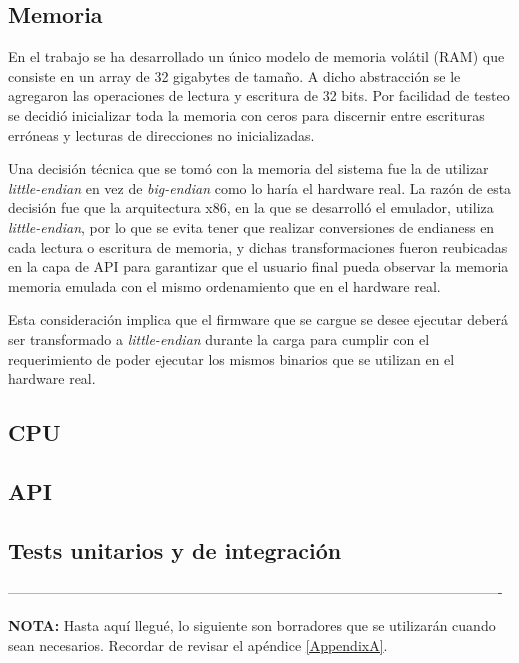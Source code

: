 \subsection{Memoria}
\label{subsec:memoria}

En el trabajo se ha desarrollado un único modelo de memoria volátil (RAM) que consiste en un array de 32 gigabytes de tamaño. A dicho abstracción se le agregaron las operaciones de lectura y escritura de 32 bits. Por facilidad de testeo se decidió inicializar toda la memoria con ceros para discernir entre escrituras erróneas y lecturas de direcciones no inicializadas.

Una decisión técnica que se tomó con la memoria del sistema fue la de utilizar \textit{little-endian} en vez de \textit{big-endian} como lo haría el hardware real. La razón de esta decisión fue que la arquitectura x86, en la que se desarrolló el emulador, utiliza \textit{little-endian}, por lo que se evita tener que realizar conversiones de endianess en cada lectura o escritura de memoria, y dichas transformaciones fueron reubicadas en la capa de API para garantizar que el usuario final pueda observar la memoria memoria emulada con el mismo ordenamiento que en el hardware real.

Esta consideración implica que el firmware que se cargue se desee ejecutar deberá ser transformado a \textit{little-endian} durante la carga para cumplir con el requerimiento de poder ejecutar los mismos binarios que se utilizan en el hardware real.

\subsection{CPU}
\label{subsec:cpu}

\subsection{API}
\label{subsec:api}

\subsection{Tests unitarios y de integración}
\label{subsec:tests_unitarios_integracion}

----------------------------------------------------------------------------------------------------------

\textbf{NOTA:} Hasta aquí llegué, lo siguiente son borradores que se utilizarán cuando sean necesarios. Recordar de revisar el apéndice \ref{AppendixA}.


